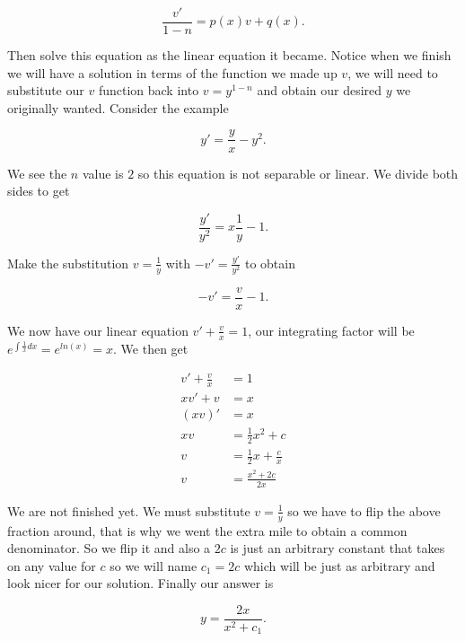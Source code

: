 \documentclass[12pt]{article}
\begin{document}
\begin{equation*}
    \frac{v'}{1-n} = p(x)v+q(x).
\end{equation*}

Then solve this equation as the linear equation it became. Notice when we finish we will have a solution in terms of the function we made up $v$, we will need to substitute our $v$ function back into $v=y^{1-n}$ and obtain our desired $y$ we originally wanted. Consider the example

\begin{equation*}
    y'=\frac{y}{x}-y^2.
\end{equation*}

We see the $n$ value is $2$ so this equation is not separable or linear. We divide both sides to get

\begin{equation*}
    \frac{y'}{y^2} = x\frac{1}{y}-1.
\end{equation*}

Make the substitution $v=\frac{1}{y}$ with $-v'=\frac{y'}{y^2}$ to obtain

\begin{equation*}
    -v'=\frac{v}{x}-1.
\end{equation*}

We now have our linear equation $v'+\frac{v}{x}=1$, our integrating factor will be $e^{\int \frac{1}{x} dx} = e^{ln(x)} = x$. We then get

\begin{align*}
    v'+\frac{v}{x} &= 1 \\
    xv' + v &= x \\
    (xv)' &= x \\
    xv &= \frac{1}{2}x^2+c \\
    v &= \frac{1}{2}x+\frac{c}{x} \\
    v &= \frac{x^2+2c}{2x}
\end{align*}

We are not finished yet. We must substitute $v=\frac{1}{y}$ so we have to flip the above fraction around, that is why we went the extra mile to obtain a common denominator. So we flip it and also a $2c$ is just an arbitrary constant that takes on any value for $c$ so we will name $c_1=2c$ which will be just as arbitrary and look nicer for our solution. Finally our answer is

\begin{equation*}
    y = \frac{2x}{x^2+c_1}.
\end{equation*}
\end{document}
